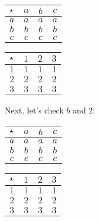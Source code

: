 \documentclass[../../../main.tex]{subfiles}
\begin{document}
\begin{fexample}
\begin{center}
  \begin{tabular}{| c || c | c | c | }
    \hline
    $\opSymbol/$ & \cellcolor{grey3} $a$ & $b$ & $c$ \\ \hline \hline
    \cellcolor{grey3}$a$          & \cellcolor{grey3}$a$ & \cellcolor{grey3}$a$ & \cellcolor{grey3}$a$ \\ \hline
    $b$          & $b$ & $b$ & $b$ \\ \hline
    $c$          & $c$ & $c$ & $c$ \\ \hline
  \end{tabular}
  \hskip 2cm
  \begin{tabular}{| c || c | c | c | }
    \hline
    $\opSymbol/$ & \cellcolor{grey3} $1$ & $2$ & $3$ \\ \hline \hline
    \cellcolor{grey3}$1$          & \cellcolor{grey3}$1$ & \cellcolor{grey3}$1$ & \cellcolor{grey3}$1$ \\ \hline
    $2$          & $2$ & $2$ & $2$ \\ \hline
    $3$          & $3$ & $3$ & $3$ \\ \hline
  \end{tabular}
\end{center}

Next, let's check $b$ and $2$:

\begin{center}
  \begin{tabular}{| c || c | c | c | }
    \hline
    $\opSymbol/$ & $a$ & \cellcolor{grey3} $b$ & $c$ \\ \hline \hline
    $a$          & $a$ & $a$ & $a$ \\ \hline
    \cellcolor{grey3} $b$          & \cellcolor{grey3} $b$ & \cellcolor{grey3} $b$ & \cellcolor{grey3} $b$ \\ \hline
    $c$          & $c$ & $c$ & $c$ \\ \hline
  \end{tabular}
  \hskip 2cm
  \begin{tabular}{| c || c | c | c | }
    \hline
    $\opSymbol/$ & $1$ & \cellcolor{grey3} $2$ & $3$ \\ \hline \hline
    $1$          & $1$ & $1$ & $1$ \\ \hline
    \cellcolor{grey3} $2$          & \cellcolor{grey3} $2$ & \cellcolor{grey3} $2$ & \cellcolor{grey3} $2$ \\ \hline
    $3$          & $3$ & $3$ & $3$ \\ \hline
  \end{tabular}
\end{center}


\end{fexample}
\end{document}
